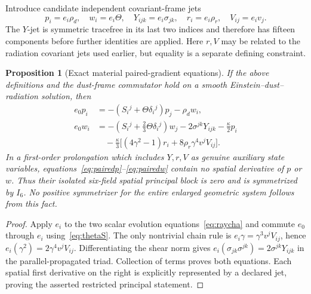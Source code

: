 \documentclass[11pt,a4paper]{article}
\newtheorem{proposition}[theorem]{Proposition}
\newcommand{\kap}{\kappa}
\begin{document}
Introduce candidate independent covariant-frame jets
\begin{equation}\label{eq:paired-def}
p_i=e_i\rho_d,\quad w_i=e_i\Theta,\quad
Y_{ijk}=e_i\sigma_{jk},\quad r_i=e_i\rho_r,\quad V_{ij}=e_iv_j.
\end{equation}
The $Y$-jet is symmetric tracefree in its last two indices and therefore has fifteen components before further identities are applied. Here $r,V$ may be related to the radiation covariant jets used earlier, but equality is a separate defining constraint.

\begin{proposition}[Exact material paired-gradient equations]\label{prop:paired}
If the above definitions and the dust-frame commutator hold on a smooth Einstein--dust--radiation solution, then
\begin{align}\label{eq:pairedp}
e_0p_i&=-(S_i{}^j+\Theta\delta_i{}^j)p_j-\rho_dw_i,\\
\label{eq:pairedw}
e_0w_i&=-(S_i{}^j+\tfrac23\Theta\delta_i{}^j)w_j
-2\sigma^{jk}Y_{ijk}-\tfrac\kap2 p_i\\
&\quad -\tfrac\kap3\big[(4\gamma^2-1)r_i+8\rho_r\gamma^4v^jV_{ij}\big].\nonumber
\end{align}
In a first-order prolongation which includes $Y,r,V$ as genuine auxiliary state variables, equations~\eqref{eq:pairedp}--\eqref{eq:pairedw} contain no spatial derivative of $p$ or $w$. Thus their \emph{isolated} six-field spatial principal block is zero and is symmetrized by $I_6$. No positive symmetrizer for the entire enlarged geometric system follows from this fact.
\end{proposition}
\begin{proof}
Apply $e_i$ to the two scalar evolution equations~\eqref{eq:raycha} and commute $e_0$ through $e_i$ using~\eqref{eq:thetaS}. The only nontrivial chain rule is
$e_i\gamma=\gamma^3v^jV_{ij}$, hence
$e_i(\gamma^2)=2\gamma^4v^jV_{ij}$.
Differentiating the shear norm gives $e_i(\sigma_{jk}\sigma^{jk})=2\sigma^{jk}Y_{ijk}$ in the parallel-propagated triad. Collection of terms proves both equations. Each spatial first derivative on the right is explicitly represented by a declared jet, proving the asserted restricted principal statement.
\end{proof}
\end{document}
